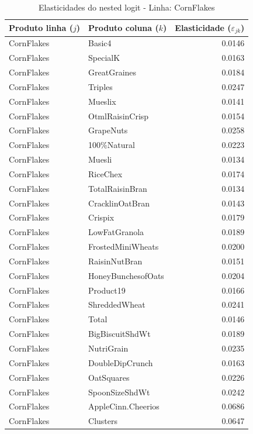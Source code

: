 
\begingroup
\begin{table}[H]
\centering
\caption{Elasticidades do nested logit - Linha: CornFlakes}
\label{tab:elas-nested-cornflakes}
\small
\begin{tabular}{llr}
\toprule
Produto linha ($j$) & Produto coluna ($k$) & Elasticidade ($\varepsilon_{jk}$) \\
\midrule
CornFlakes & Basic4 & 0.0146 \\
CornFlakes & SpecialK & 0.0163 \\
CornFlakes & GreatGraines & 0.0184 \\
CornFlakes & Triples & 0.0247 \\
CornFlakes & Mueslix & 0.0141 \\
CornFlakes & OtmlRaisinCrisp & 0.0154 \\
CornFlakes & GrapeNuts & 0.0258 \\
CornFlakes & 100\%Natural & 0.0223 \\
CornFlakes & Muesli & 0.0134 \\
CornFlakes & RiceChex & 0.0174 \\
CornFlakes & TotalRaisinBran & 0.0134 \\
CornFlakes & CracklinOatBran & 0.0143 \\
CornFlakes & Crispix & 0.0179 \\
CornFlakes & LowFatGranola & 0.0189 \\
CornFlakes & FrostedMiniWheats & 0.0200 \\
CornFlakes & RaisinNutBran & 0.0151 \\
CornFlakes & HoneyBunchesofOats & 0.0204 \\
CornFlakes & Product19 & 0.0166 \\
CornFlakes & ShreddedWheat & 0.0241 \\
CornFlakes & Total & 0.0146 \\
CornFlakes & BigBiscuitShdWt & 0.0189 \\
CornFlakes & NutriGrain & 0.0235 \\
CornFlakes & DoubleDipCrunch & 0.0163 \\
CornFlakes & OatSquares & 0.0226 \\
CornFlakes & SpoonSizeShdWt & 0.0242 \\
CornFlakes & AppleCinn.Cheerios & 0.0686 \\
CornFlakes & Clusters & 0.0647 \\

\end{tabular}
\end{table}
